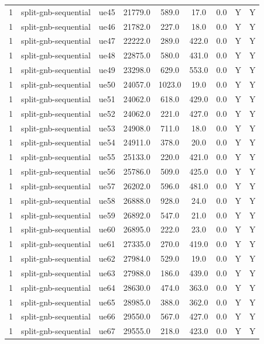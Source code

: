 \begin{table}[ht]
\begin{tabular}{|c|c|c|c|c|c|c|c|c|}
1 & split-gnb-sequential & ue45 & 21779.0 & 589.0 & 17.0 & 0.0 & Y & Y \\
1 & split-gnb-sequential & ue46 & 21782.0 & 227.0 & 18.0 & 0.0 & Y & Y \\
1 & split-gnb-sequential & ue47 & 22222.0 & 289.0 & 422.0 & 0.0 & Y & Y \\
1 & split-gnb-sequential & ue48 & 22875.0 & 580.0 & 431.0 & 0.0 & Y & Y \\
1 & split-gnb-sequential & ue49 & 23298.0 & 629.0 & 553.0 & 0.0 & Y & Y \\
1 & split-gnb-sequential & ue50 & 24057.0 & 1023.0 & 19.0 & 0.0 & Y & Y \\
1 & split-gnb-sequential & ue51 & 24062.0 & 618.0 & 429.0 & 0.0 & Y & Y \\
1 & split-gnb-sequential & ue52 & 24062.0 & 221.0 & 427.0 & 0.0 & Y & Y \\
1 & split-gnb-sequential & ue53 & 24908.0 & 711.0 & 18.0 & 0.0 & Y & Y \\
1 & split-gnb-sequential & ue54 & 24911.0 & 378.0 & 20.0 & 0.0 & Y & Y \\
1 & split-gnb-sequential & ue55 & 25133.0 & 220.0 & 421.0 & 0.0 & Y & Y \\
1 & split-gnb-sequential & ue56 & 25786.0 & 509.0 & 425.0 & 0.0 & Y & Y \\
1 & split-gnb-sequential & ue57 & 26202.0 & 596.0 & 481.0 & 0.0 & Y & Y \\
1 & split-gnb-sequential & ue58 & 26888.0 & 928.0 & 24.0 & 0.0 & Y & Y \\
1 & split-gnb-sequential & ue59 & 26892.0 & 547.0 & 21.0 & 0.0 & Y & Y \\
1 & split-gnb-sequential & ue60 & 26895.0 & 222.0 & 23.0 & 0.0 & Y & Y \\
1 & split-gnb-sequential & ue61 & 27335.0 & 270.0 & 419.0 & 0.0 & Y & Y \\
1 & split-gnb-sequential & ue62 & 27984.0 & 529.0 & 19.0 & 0.0 & Y & Y \\
1 & split-gnb-sequential & ue63 & 27988.0 & 186.0 & 439.0 & 0.0 & Y & Y \\
1 & split-gnb-sequential & ue64 & 28630.0 & 474.0 & 363.0 & 0.0 & Y & Y \\
1 & split-gnb-sequential & ue65 & 28985.0 & 388.0 & 362.0 & 0.0 & Y & Y \\
1 & split-gnb-sequential & ue66 & 29550.0 & 567.0 & 427.0 & 0.0 & Y & Y \\
1 & split-gnb-sequential & ue67 & 29555.0 & 218.0 & 423.0 & 0.0 & Y & Y \\

\end{tabular}
\end{table}

